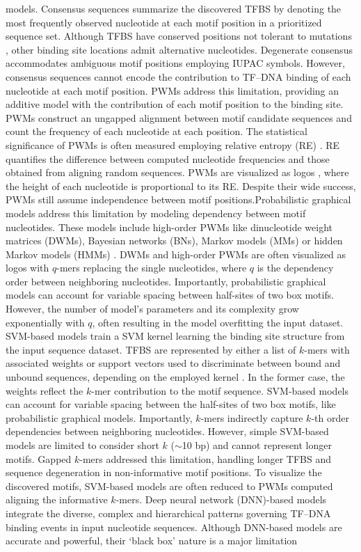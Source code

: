 \documentclass[a4paper, titlepage, openright]{book}
\begin{document}
\citep{he2021survey} models. Consensus sequences summarize the discovered TFBS by denoting the most frequently observed nucleotide at each motif position in a prioritized sequence set. Although TFBS have conserved positions not tolerant to mutations \citep{li2015human}, other binding site locations admit alternative nucleotides. Degenerate consensus accommodates ambiguous motif positions employing IUPAC symbols. However, consensus sequences cannot encode the contribution to TF–DNA binding of each nucleotide at each motif position. PWMs address this limitation, providing an additive model with the contribution of each motif position to the binding site. PWMs construct an ungapped alignment between motif candidate sequences and count the frequency of each nucleotide at each position. The statistical significance of PWMs is often measured employing relative entropy (RE) \citep{stormo1998information}. RE quantifies the difference between computed nucleotide frequencies and those obtained from aligning random sequences. PWMs are visualized as logos \citep{schneider1990sequence}, where the height of each nucleotide is proportional to its RE. Despite their wide success, PWMs still assume independence between motif positions.Probabilistic graphical models address this limitation by modeling dependency between motif nucleotides. These models include high-order PWMs like dinucleotide weight matrices (DWMs), Bayesian networks (BNs), Markov models (MMs) or hidden Markov models (HMMs) \citep{siddharthan2010dinucleotide, korhonen2017fast, barash2003modeling, siebert2016bayesian}. DWMs and high-order PWMs are often visualized as logos with $q$-mers replacing the single nucleotides, where $q$ is the dependency order between neighboring nucleotides. Importantly, probabilistic graphical models can account for variable spacing between half-sites of two box motifs. However, the number of model’s parameters and its complexity grow exponentially with $q$, often resulting in the model overfitting the input dataset. SVM-based models train a SVM kernel learning the binding site structure from the input sequence dataset. TFBS are represented by either a list of $k$-mers with associated weights or support vectors used to discriminate between bound and unbound sequences, depending on the employed kernel \citep{boeva2016analysis}. In the former case, the weights reflect the $k$-mer contribution to the motif sequence. SVM-based models can account for variable spacing between the half-sites of two box motifs, like probabilistic graphical models. Importantly, $k$-mers indirectly capture $k$-th order dependencies between neighboring nucleotides. However, simple SVM-based models are limited to consider short $k$ ($\sim$10 bp) and cannot represent longer motifs. Gapped $k$-mers \citep{ghandi2014robust} addressed this limitation, handling longer TFBS and sequence degeneration in non-informative motif positions. To visualize the discovered motifs, SVM-based models are often reduced to PWMs computed aligning the informative $k$-mers. Deep neural network (DNN)-based models integrate the diverse, complex and hierarchical patterns governing TF–DNA binding events in input nucleotide sequences. Although DNN-based models are accurate and powerful, their ‘black box’ nature is a major limitation 
\end{document}
